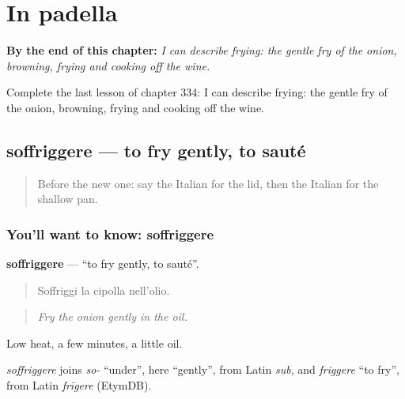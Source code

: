 
\chapter{In padella}
\label{ch:it-in-padella}

\begin{chapteropening}
\textbf{By the end of this chapter:} \emph{I can describe frying: the gentle fry of the onion, browning, frying and cooking off the wine.}

Complete the last lesson of chapter 334: I can describe frying: the gentle fry of the onion, browning, frying and cooking off the wine.
\end{chapteropening}

\section[soffriggere]{soffriggere — to fry gently, to sauté}

\label{lesson:IT-C334-soffriggere}



\begin{quote}
Before the new one: say the Italian for the lid, then the Italian for the shallow pan.
\end{quote}

\subsection*{You'll want to know: soffriggere}
\textbf{soffriggere} — \textquotedblleft{}to fry gently, to sauté\textquotedblright{}.

\begin{quote}
Soffriggi la cipolla nell'olio.
\end{quote}

\begin{quote}
\emph{Fry the onion gently in the oil.}
\end{quote}

Low heat, a few minutes, a little oil.

\begin{cousinweb}
\emph{soffriggere} joins \emph{so-} \textquotedblleft{}under\textquotedblright{}, here \textquotedblleft{}gently\textquotedblright{}, from Latin \emph{sub}, and \emph{friggere} \textquotedblleft{}to fry\textquotedblright{}, from Latin \emph{frīgere} (EtymDB).
\end{cousinweb}

